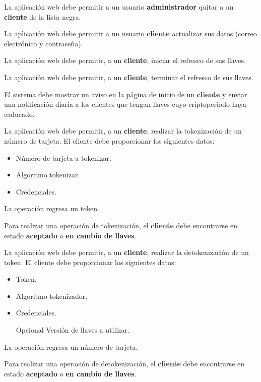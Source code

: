 {
  La aplicación web debe permitir a un usuario \textbf{administrador} quitar a
  un \textbf{cliente} de la lista negra.
}

{
  La aplicación web debe permitir a un usuario \textbf{cliente} actualizar sus
  datos (correo electrónico y contraseña).
}

{
  La aplicación web debe permitir, a un \textbf{cliente}, iniciar el refresco de
  sus llaves.
}

{
  La aplicación web debe permitir, a un \textbf{cliente}, terminar el refresco
  de sus llaves.
}

{
  El sistema debe mostrar un aviso en la página de inicio de un \textbf{cliente}
  y enviar una notificación diaria a los clientes que tengan llaves cuyo
  criptoperiodo haya caducado.
}

{
  La aplicación web debe permitir, a un \textbf{cliente}, realizar la
  tokenización de un número de tarjeta. El cliente debe proporcionar los
  siguientes datos:
  \begin{itemize}
    \item Número de tarjeta a tokenizar.
    \item Algoritmo tokenizar.
    \item Credenciales.
  \end{itemize}
  La operación regresa un token.

  {
    Para realizar una operación de tokenización, el \textbf{cliente} debe
    encontrarse en estado \textbf{aceptado} o \textbf{en cambio de llaves}.
  }
}

{
  La aplicación web debe permitir, a un \textbf{cliente}, realizar la
  detokenización de un token. El cliente debe proporcionar los siguientes datos:
  \begin{itemize}
    \item Token.
    \item Algoritmo tokenizador.
    \item Credenciales.
    \item [Opcional] Versión de llaves a utilizar.
  \end{itemize}
  La operación regresa un número de tarjeta.

  {
    Para realizar una operación de detokenización, el \textbf{cliente} debe
    encontrarse en estado \textbf{aceptado} o \textbf{en cambio de llaves}.
  }
}

